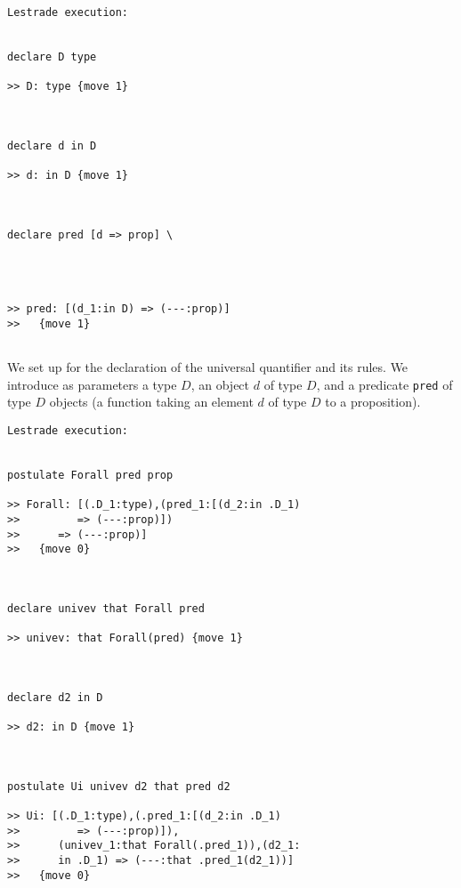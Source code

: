 \documentclass{slides}
\begin{document}
\begin{slide}
{\small
\begin{verbatim}Lestrade execution:


declare D type

>> D: type {move 1}



declare d in D

>> d: in D {move 1}



declare pred [d => prop] \
   



>> pred: [(d_1:in D) => (---:prop)]
>>   {move 1}


\end{verbatim}
}

\end{slide}

\begin{slide}

We set up for the declaration of the universal quantifier and its rules.  We introduce as parameters a type $D$, an object $d$ of type $D$, and a predicate {\tt pred} of type $D$ objects
(a function taking an element $d$ of type $D$ to a proposition).

\end{slide}

\begin{slide}
{\small
\begin{verbatim}Lestrade execution:


postulate Forall pred prop

>> Forall: [(.D_1:type),(pred_1:[(d_2:in .D_1)
>>         => (---:prop)])
>>      => (---:prop)]
>>   {move 0}



declare univev that Forall pred

>> univev: that Forall(pred) {move 1}



declare d2 in D

>> d2: in D {move 1}



postulate Ui univev d2 that pred d2

>> Ui: [(.D_1:type),(.pred_1:[(d_2:in .D_1)
>>         => (---:prop)]),
>>      (univev_1:that Forall(.pred_1)),(d2_1:
>>      in .D_1) => (---:that .pred_1(d2_1))]
>>   {move 0}


\end{verbatim}

}

\end{slide}
\end{document}
